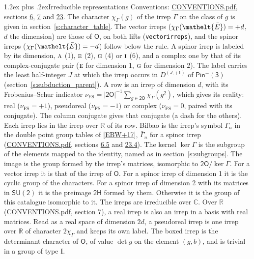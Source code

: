 \documentclass[10pt,a4paper]{article}
\makeatletter
\renewcommand\section{\@startsection{section}{1}{\z@}{-3ex plus -1ex minus -.2ex}%
  {1.2ex plus .2ex}{\normalfont\large\sffamily\bfseries\color{parttitle}}}
\numberwithin{equation}{section}
\newcommand{\eltfont}[1]{{\let\sigma\eltsigma\mathelt{#1}}}
\newcommand{\grp}[1]{\mathsf{#1}}
\newcommand{\irr}[1]{\text{\normalfont\scshape #1}}
\newcommand{\elt}[1]{\eltfont{#1}}
\newcommand{\irrJp}[2]{D^{(#1,#2)}}
\newcommand{\irchar}[1]{\chi_{#1}}
\newcommand{\fsind}{\nu_{\mathrm{FS}}}
\newcommand{\barred}[1]{\bar{#1}}
\makeatother
\begin{document}
\section{Irreducible representations}\label{s:irreps}
Conventions: \href{../../CONVENTIONS.pdf}{CONVENTIONS.pdf}, sections \href{../../../rotation/CONVENTIONS.pdf\#conv.6}{6}, \href{../../../rotation/CONVENTIONS.pdf\#conv.7}{7} and \href{../../CONVENTIONS.pdf\#conv.23}{23}.
\leavevmode\label{n:function.character}\label{n:irrep.Gamma}The character $\irchar{\Gamma}(g)$ of the irrep $\Gamma$ on the class of $g$ is given in section~\ref{s:character_table}. \label{n:index.dimension}The vector irreps ($\irchar{\Gamma}(\elt{\barred{E}}) = +d$, $d$ the dimension) are those of \href{../../../rotation/data/pdf/O.pdf}{$\grp{O}$}, on both lifts (\texttt{vectorirreps}), and the spinor irreps ($\irchar{\Gamma}(\elt{\barred{E}}) = -d$) follow below the rule. A spinor irrep is labeled by its dimension, $\irr{a}$ (1), $\irr{e}$ (2), $\irr{g}$ (4) or $\irr{i}$ (6), and a complex one by that of its complex-conjugate pair ($\irr{e}$ for dimension 1, $\irr{g}$ for dimension 2). The label carries the least half-integer $J$ at which the irrep occurs in $\irrJp{J}{+1}$ of $\grp{Pin^{-}(3)}$ (section~\ref{s:subduction_parent}).
\leavevmode\label{n:index.frobenius}\label{n:head.irrep}\label{n:head.reality}A row is an irrep of dimension $d$, with its Frobenius--Schur indicator $\fsind = |\grp{2O}|^{-1}\allowbreak\sum_{g\in\grp{2O}}\irchar{\Gamma}(g^2)$, which gives its reality: real ($\fsind = +1$), pseudoreal ($\fsind = -1$) or complex ($\fsind = 0$, paired with its conjugate). \label{n:head.conjugate}The column conjugate gives that conjugate (a dash for the others). \label{n:head.over.real}Each irrep lies in the irrep over $\mathbb{R}$ of its row. \label{n:head.bilbao}\label{n:irrep.alias.gamma}Bilbao is the irrep's symbol $\Gamma_n$ in the double point group tables of [\href{../../../REFERENCES.pdf\#ref.EBW+17}{EBW+17}], $\bar{\Gamma}_n$ for a spinor irrep (\href{../../CONVENTIONS.pdf}{CONVENTIONS.pdf}, sections \href{../../../rotation/CONVENTIONS.pdf\#conv.6.5}{6.5} and \href{../../CONVENTIONS.pdf\#conv.23.4}{23.4}). \label{n:head.kernel}The kernel $\ker\Gamma$ is the subgroup of the elements mapped to the identity, named as in section~\ref{s:subgroups}. \label{n:head.image}The image is the group formed by the irrep's matrices, isomorphic to $\grp{2O}/\ker\Gamma$. For a vector irrep it is that of the irrep of \href{../../../rotation/data/pdf/O.pdf}{$\grp{O}$}. For a spinor irrep of dimension 1 it is the cyclic group of the characters. For a spinor irrep of dimension 2 with its matrices in $\grp{SU(2)}$ it is the preimage $\grp{2H}$ formed by them. Otherwise it is the group of this catalogue isomorphic to it. The irreps are irreducible over $\mathbb{C}$. Over $\mathbb{R}$ (\href{../../CONVENTIONS.pdf}{CONVENTIONS.pdf}, section \href{../../../rotation/CONVENTIONS.pdf\#conv.7}{7}), a real irrep is also an irrep in a basis with real matrices. Read as a real space of dimension $2d$, a pseudoreal irrep is one irrep over $\mathbb{R}$ of character $2\irchar{\Gamma}$ and keeps its own label. \label{n:mark.determinant}The boxed irrep is the determinant character of \href{../../../rotation/data/pdf/O.pdf}{$\grp{O}$}, of value $\det g$ on the element $(g, b)$, and is trivial in a group of type I.
\end{document}
